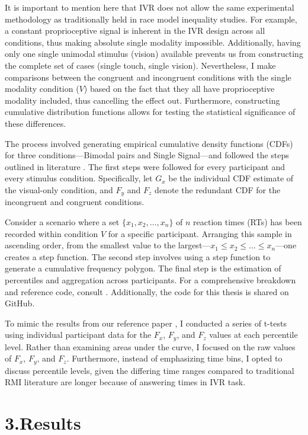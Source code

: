 \documentclass[12pt,oneside,openright]{report}
\begin{document}
It is important to mention here that IVR does not allow the same experimental methodology as traditionally held in race model inequality studies. For example, a constant proprioceptive signal is inherent in the IVR design across all conditions, thus making absolute single modality impossible. Additionally, having only one single unimodal stimulus (vision) available prevents us from constructing the complete set of cases (single touch, single vision). Nevertheless, I make comparisons between the congruent and incongruent conditions with the single modality condition ($V$) based on the fact that they all have proprioceptive modality included, thus cancelling the effect out. Furthermore, constructing cumulative distribution functions allows for testing the statistical significance of these differences.

The process involved generating empirical cumulative density functions (CDFs) for three conditions—Bimodal pairs and Single Signal—and followed the steps outlined in literature \parencite{Ulrich2007}. The first steps were followed for every participant and every stimulus condition. Specifically, let $G_x$ be the individual CDF estimate of the visual-only condition, and $F_y$ and $F_z$ denote the redundant CDF for the incongruent and congruent conditions.

Consider a scenario where a set $\{x_1, x_2, \ldots , x_n\}$ of $n$ reaction times (RTs) has been recorded within condition $V$ for a specific participant. Arranging this sample in ascending order, from the smallest value to the largest—$x_1 \leq x_2 \leq \ldots \leq x_n$—one creates a step function. The second step involves using a step function to generate a cumulative frequency polygon. The final step is the estimation of percentiles and aggregation across participants. For a comprehensive breakdown and reference code, consult \cite{Ulrich2007}. Additionally, the code for this thesis is shared on GitHub.

To mimic the results from our reference paper \Cite{SALTAFOSSI2023108642}, I conducted a series of t-tests using individual participant data for the $F_x$, $F_y$, and $F_z$ values at each percentile level. Rather than examining areas under the curve, I focused on the raw values of $F_x$, $F_y$, and $F_z$. Furthermore, instead of emphasizing time bins, I opted to discuss percentile levels, given the differing time ranges compared to traditional RMI literature are longer because of answering times in IVR task.

\section*{3.Results}
\end{document}
